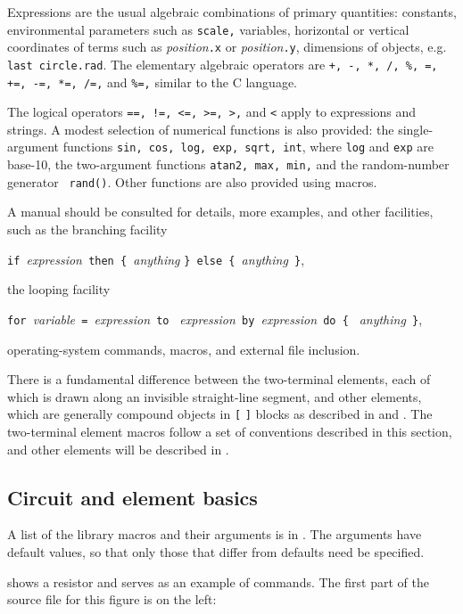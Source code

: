 Expressions are the usual algebraic combinations of primary quantities:
constants, environmental parameters such as {\tt scale,} variables,
horizontal or vertical coordinates of terms such as
{\sl position}{\tt.x} or {\sl position}{\tt.y},
dimensions of \pic objects, e.g. {\tt last circle.rad}.
The elementary algebraic operators are
{\tt +, -, *, /, \%, =, +=, -=, *=, /=,} and {\tt \%=,}
similar to the C language.

The logical operators {\tt ==, !=, <=, >=, >,} and {\tt <} apply to
expressions and strings.  A modest selection of numerical functions is
also provided: the single-argument functions {\tt sin, cos, log, exp,
sqrt, int}, where {\tt log} and {\tt exp} are base-10, the two-argument
functions {\tt atan2, max, min,} and the random-number generator {\tt
rand()}.  Other functions are also provided using macros.

A \pic manual should be consulted for details, more examples, and
other facilities, such as the branching facility

\verb|if |{\sl expression}\verb| then { |{\sl anything} 
  \verb|} else { |{\sl anything}\verb| }|,

\noindent%
the looping facility

\verb|for |{\sl variable}\verb| = |{\sl expression}\verb| to |%
{\sl expression}\verb| by |{\sl expression}\verb| do { |%
{\sl anything}\verb| }|,

\noindent%
operating-system commands, \pic macros, and external file inclusion.

There is a fundamental difference between the two-terminal elements, each
of which is drawn along an invisible straight-line
segment, and other elements, which are generally compound objects
in {\tt[} {\tt]} blocks as described in 
and .
The two-terminal element macros follow a
set of conventions described in this section, and other elements will
be described in .

\subsection{Circuit and element basics\label{Basics:}}
A list of the library macros and their arguments is in
.  The arguments have default values, so that only
those that differ from defaults need be specified.

 shows a resistor and serves as
an example of \pic commands.
The first part of the source file for this figure is 
on the left:

